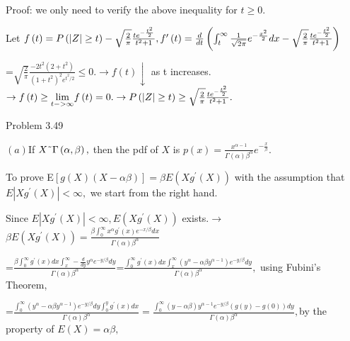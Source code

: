 \documentclass{article}
\begin{document}

\bigskip Proof: we only need to verify the above inequality for $t\geq 0.$

Let $f\left( t\right) =P\left( \left\vert Z\right\vert \geq t\right) -\sqrt{%
\frac{2}{\pi }}\frac{te^{-\frac{t^{2}}{2}}}{t^{2}+1},f^{\prime }\left(
t\right) =\frac{d}{dt}\left( \int_{t}^{\infty }\frac{1}{\sqrt{2\pi }}e^{-%
\frac{x^{2}}{2}}dx-\sqrt{\frac{2}{\pi }}\frac{te^{-\frac{t^{2}}{2}}}{t^{2}+1}%
\right) $

=$\sqrt{\frac{2}{\pi }}\frac{-2t^{2}\left( 2+t^{2}\right) }{\left(
1+t^{2}\right) ^{2}e^{t^{2}/2}}\leq 0.\rightarrow f\left( t\right)
\downarrow $ as t increases. $\rightarrow f\left( t\right) \geq \underset{%
t->\infty }{\lim }f\left( t\right) =0.\rightarrow P\left( \left\vert
Z\right\vert \geq t\right) \geq \sqrt{\frac{2}{\pi }}\frac{te^{-\frac{t^{2}}{%
2}}}{t^{2}+1}.$  

Problem 3.49

$\left( a\right) $If $X\symbol{126}\Gamma \left( \alpha ,\beta \right) ,$%
then the pdf of $X$ is $p(x)=\frac{x^{\alpha -1}}{\Gamma \left( \alpha
\right) \beta ^{\alpha }}e^{-\frac{x}{\beta }}.$

To prove E$\left[ g\left( X\right) \left( X-\alpha \beta \right) \right]
=\beta E\left( Xg^{\prime }\left( X\right) \right) $ with the assumption
that $E\left\vert Xg^{\prime }\left( X\right) \right\vert <\infty ,$ we
start from the right hand.

Since $E\left\vert Xg^{\prime }\left( X\right) \right\vert <\infty ,E\left(
Xg^{\prime }\left( X\right) \right) $ exists.$\rightarrow $ $\beta E\left(
Xg^{\prime }\left( X\right) \right) =\frac{\beta \int_{0}^{\infty }x^{\alpha
}g^{\prime }\left( x\right) e^{-x/\beta }dx}{\Gamma \left( \alpha \right)
\beta ^{\alpha }}$

=$\frac{\beta \int_{0}^{\infty }g^{\prime }\left( x\right)
dx\int_{x}^{\infty }-\frac{d}{dy}y^{\alpha }e^{-y/\beta }dy}{\Gamma \left(
\alpha \right) \beta ^{\alpha }}$=$\frac{\int_{0}^{\infty }g^{\prime }\left(
x\right) dx\int_{x}^{\infty }\left( y^{\alpha }-\alpha \beta y^{\alpha
-1}\right) e^{-y/\beta }dy}{\Gamma \left( \alpha \right) \beta ^{\alpha }},$%
using Fubini's Theorem,

=$\frac{\int_{0}^{\infty }\left( y^{\alpha }-\alpha \beta y^{\alpha
-1}\right) e^{-y/\beta }dy\int_{0}^{y}g^{\prime }\left( x\right) dx}{\Gamma
\left( \alpha \right) \beta ^{\alpha }}=\frac{\int_{0}^{\infty }\left(
y-\alpha \beta \right) y^{\alpha -1}e^{-y/\beta }\left( g\left( y\right)
-g\left( 0\right) \right) dy}{\Gamma \left( \alpha \right) \beta ^{\alpha }},
$by the property of $E\left( X\right) =\alpha \beta ,$
\end{document}
